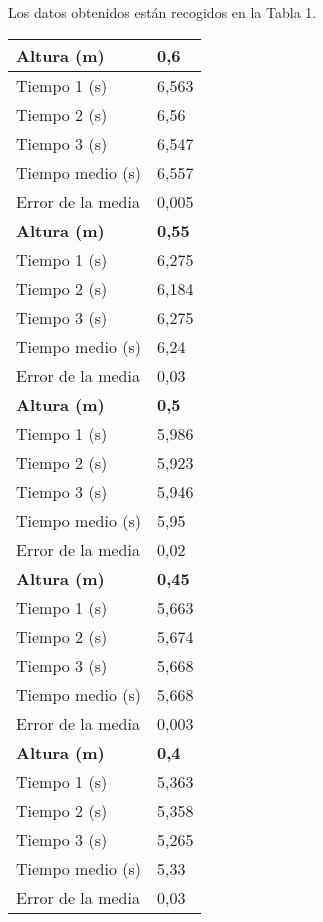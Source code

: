 \documentclass[a4paper,12pt,spanish]{article}
\begin{document}
Los datos obtenidos están recogidos en la Tabla 1.



\begin{table}[H]
	\begin{minipage}[t]{.48\linewidth}
		\centering
		\begin{tabular}{|l|l|}
			\hline
			\textbf{Altura (m)}         & \textbf{0,6}   \\ \hline
			Tiempo 1 (s)      & 6,563 \\ \hline
			Tiempo 2 (s)      & 6,56  \\ \hline
			Tiempo 3 (s)      & 6,547 \\ \hline
			Tiempo medio (s)  & 6,557 \\ \hline
			Error de la media & 0,005 \\ \hline\hline
			\textbf{Altura (m)}         & \textbf{0,55}   \\ \hline
			Tiempo 1 (s)      & 6,275 \\ \hline
			Tiempo 2 (s)      & 6,184 \\ \hline
			Tiempo 3 (s)      & 6,275 \\ \hline
			Tiempo medio (s)  & 6,24  \\ \hline
			Error de la media & 0,03  \\ \hline\hline
			\textbf{Altura (m)}         & \textbf{0,5}   \\ \hline
			Tiempo 1 (s)      & 5,986 \\ \hline
			Tiempo 2 (s)      & 5,923 \\ \hline
			Tiempo 3 (s)      & 5,946 \\ \hline
			Tiempo medio (s)  & 5,95  \\ \hline
			Error de la media & 0,02  \\ \hline\hline
			\textbf{Altura (m)}         & \textbf{0,45}   \\ \hline
			Tiempo 1 (s)      & 5,663 \\ \hline
			Tiempo 2 (s)      & 5,674 \\ \hline
			Tiempo 3 (s)      & 5,668 \\ \hline
			Tiempo medio (s)  & 5,668 \\ \hline
			Error de la media & 0,003 \\ \hline\hline
			\textbf{Altura (m)}         & \textbf{0,4}   \\ \hline
			Tiempo 1 (s)      & 5,363 \\ \hline
			Tiempo 2 (s)      & 5,358 \\ \hline
			Tiempo 3 (s)      & 5,265 \\ \hline
			Tiempo medio (s)  & 5,33  \\ \hline
			Error de la media & 0,03  \\ \hline
		\end{tabular}
		

\end{minipage}
\end{table}
\end{document}
